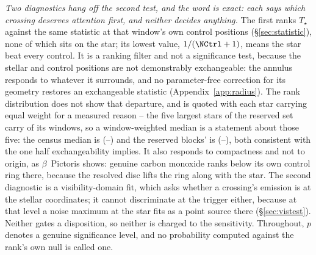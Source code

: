 \emph{Two diagnostics hang off the second test, and the word is exact: each
says which crossing deserves attention first, and neither decides anything.}
The first ranks $T_\star$ against the same statistic at that window's own
\NCtrl{} control positions (\S\ref{sec:statistic}), none of which
sits on the star; its lowest value, $1/(\NCtrl+1)$, means the star beat every
control. It is a ranking filter and not a significance test, because the
stellar and control positions are not demonstrably exchangeable: the annulus
responds to whatever it surrounds, and no parameter-free correction for its
geometry restores an exchangeable statistic (Appendix~\ref{app:radius}). The
rank distribution does not show that departure, and is quoted with each star
carrying equal weight for a measured reason -- the five largest stars of the
reserved set carry \BkRankTopFiveWin{} of its \HoWin{} windows, so a
window-weighted median is a statement about those five: the census median is
\BkRankBalSurv{} (\BkRankBalSurvLo--\BkRankBalSurvHi) and the reserved
blocks' is \BkRankBalHo{} (\BkRankBalHoLo--\BkRankBalHoHi), both consistent
with the one half exchangeability implies. It
also responds to compactness and not to origin, as $\beta$~Pictoris
shows: genuine carbon monoxide ranks below its own control ring there,
because the resolved disc lifts the ring along with the star. The second
diagnostic is a visibility-domain fit, which asks whether a crossing's
emission is at the stellar coordinates; it
cannot discriminate at the trigger either, because at that level a noise
maximum at the star fits as a point source there
(\S\ref{sec:vistest}). Neither gates a
disposition, so neither is charged to the sensitivity.
Throughout, $p$ denotes a genuine significance level, and no probability
computed against the rank's own null is called one.

